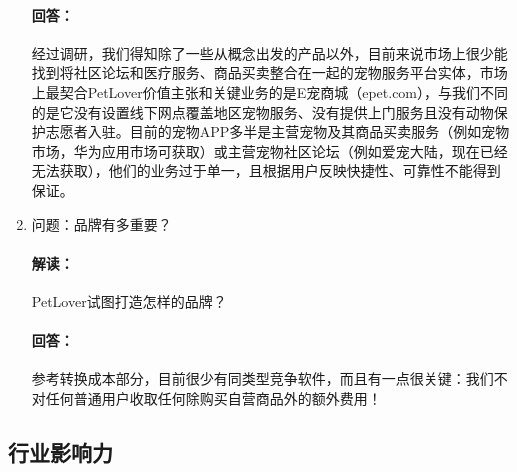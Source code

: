 \documentclass[a4paper]{ctexart}
\begin{document}
\begin{enumerate}[label=\alph*.]
  \paragraph{回答：}经过调研，我们得知除了一些从概念出发的产品以外，目前来说市场上很少能找到将社区论坛和医疗服务、商品买卖整合在一起的宠物服务平台实体，市场上最契合PetLover价值主张和关键业务的是E宠商城（epet.com），与我们不同的是它没有设置线下网点覆盖地区宠物服务、没有提供上门服务且没有动物保护志愿者入驻。目前的宠物APP多半是主营宠物及其商品买卖服务（例如宠物市场，华为应用市场可获取）或主营宠物社区论坛（例如爱宠大陆，现在已经无法获取），他们的业务过于单一，且根据用户反映快捷性、可靠性不能得到保证。
  \item 问题：品牌有多重要？
  \paragraph{解读：}PetLover试图打造怎样的品牌？
  \paragraph{回答：}参考转换成本部分，目前很少有同类型竞争软件，而且有一点很关键：我们不对任何普通用户收取任何除购买自营商品外的额外费用！
\end{enumerate}
\subsection{行业影响力}
\end{document}
